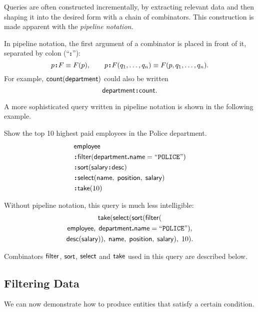 Queries are often constructed incrementally, by extracting relevant data and
then shaping it into the desired form with a chain of combinators.  This
construction is made apparent with the \emph{pipeline notation}.

In pipeline notation, the first argument of a combinator is placed in front of
it, separated by colon (``$\,\!\boldsymbol{:}\!\,$''):
\begin{equation*}
    p \!\boldsymbol{:}\! F \equiv F(p), \qquad
    p \!\boldsymbol{:}\! F(q_1,\ldots,q_n) \equiv F(p,q_1,\ldots,q_n).
\end{equation*}
For example, $\mathsf{count}(\mathsf{department})$ could also be written
\begin{equation*}
    \mathsf{department}\!\boldsymbol{:}\!\mathsf{count}.
\end{equation*}

A more sophisticated query written in pipeline notation is shown in the
following example.

\begin{demo}
    \label{ex:top-ten-highest-paid-policemen}
    Show the top 10 highest paid employees in the Police department.
    \begin{align*}
        & \Employee \\
        & \Apply\Filter(\Department\To\Name = \textliteral{POLICE}) \\
        & \Apply\Sort(\Salary\Apply\Desc) \\
        & \Apply\Select(\Name,\; \Position,\; \Salary) \\
        & \Apply\Take(10)
    \end{align*}
\end{demo}

Without pipeline notation, this query is much less intelligible:
\begin{multline*}
    \mathsf{take}(\mathsf{select}(\mathsf{sort}(\mathsf{filter}( \\
    \mathsf{employee},\; \mathsf{department}\boldsymbol{.}\mathsf{name} = \mathtt{``POLICE"}), \\
    \mathsf{desc}(\mathsf{salary})),\; \mathsf{name},\; \mathsf{position},\; \mathsf{salary}),\; 10).
\end{multline*}

Combinators $\mathsf{filter}$, $\mathsf{sort}$, $\mathsf{select}$ and $\mathsf{take}$ used in this query are
described below.

\subsection*{Filtering Data}

We can now demonstrate how to produce entities that satisfy a certain
condition.


